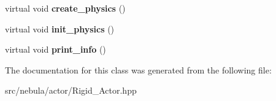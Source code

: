 \begin{DoxyCompactItemize}
\item 
\hypertarget{classneb_1_1Actor_1_1RigidActor_ae43181ba4f6b5b3fb782f6a689ec5dc5}{
virtual void {\bfseries create\_\-physics} ()}
\label{classneb_1_1Actor_1_1RigidActor_ae43181ba4f6b5b3fb782f6a689ec5dc5}

\item 
\hypertarget{classneb_1_1Actor_1_1RigidActor_a558079bb45a9986bfbfcb92c2d8e005a}{
virtual void {\bfseries init\_\-physics} ()}
\label{classneb_1_1Actor_1_1RigidActor_a558079bb45a9986bfbfcb92c2d8e005a}

\item 
\hypertarget{classneb_1_1Actor_1_1RigidActor_a584f596160a4b44a1ddc6cc24b405d04}{
virtual void {\bfseries print\_\-info} ()}
\label{classneb_1_1Actor_1_1RigidActor_a584f596160a4b44a1ddc6cc24b405d04}

\end{DoxyCompactItemize}


The documentation for this class was generated from the following file:\begin{DoxyCompactItemize}
\item 
src/nebula/actor/Rigid\_\-Actor.hpp\end{DoxyCompactItemize}
